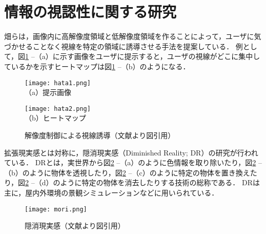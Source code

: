 \section{情報の視認性に関する研究}
  畑らは，画像内に高解像度領域と低解像度領域を作ることによって，ユーザに気づかせることなく視線を特定の領域に誘導させる手法を提案している\cite{Hata:2016}．
  例として，図\ref{figure:hata} --（a）に示す画像をユーザに提示すると，ユーザの視線がどこに集中しているかを示すヒートマップは図\ref{figure:hata} --（b）のようになる．
  \begin{figure}[tb]
    \begin{minipage}{0.49\hsize}
      \begin{center}
        \texttt{[image: hata1.png]}\\
        \small{（a）提示画像}
      \end{center}
    \end{minipage}
    \begin{minipage}{0.49\hsize}
      \begin{center}
        \texttt{[image: hata2.png]}\\
        \small{（b）ヒートマップ}
      \end{center}
    \end{minipage}
    \vspace{2pt}
    \caption{解像度制御による視線誘導（文献\cite{Hata:2016}より図引用）}
    \label{figure:hata}
  \end{figure}

  拡張現実感とは対称に，隠消現実感（Diminished Reality; DR）の研究が行われている\cite{Mori:2017}．
  DRとは，実世界から図\ref{figure:mori} --（a）のように色情報を取り除いたり，図\ref{figure:mori} --（b）のように物体を透視したり，図\ref{figure:mori} --（c）のように特定の物体を置き換えたり，図\ref{figure:mori} --（d）のように特定の物体を消去したりする技術の総称である．
  DRは主に，屋内外環境の景観シミュレーションなどに用いられている\cite{Kawai:2016}．
  \begin{figure}[tb]
    \centerline{\texttt{[image: mori.png]}}
    \caption{隠消現実感（文献\cite{Mori:2017}より図引用）}
    \label{figure:mori}
  \end{figure}

